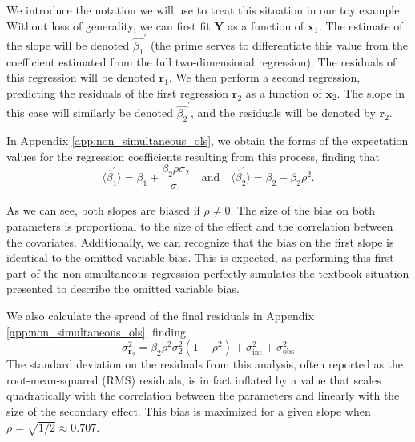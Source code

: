We introduce the notation we will use to treat this situation in our toy example. Without loss of generality, we can first fit $\bm{Y}$ as a function of $\bm{x}_1$. The estimate of the slope will be denoted $\hat{\beta_1}^\prime$ (the prime serves to differentiate this value from the coefficient estimated from the full two-dimensional regression). The residuals of this regression will be denoted $\bm{r}_1$. We then perform a second regression, predicting the residuals of the first regression $\bm{r}_2$ as a function of $\bm{x}_2$. The slope in this case will similarly be denoted $\hat{\beta_2}^\prime$, and the residuals will be denoted by $\bm{r}_2$.

In Appendix \ref{app:non_simultaneous_ols}, we obtain the forms of the expectation values for the regression coefficients resulting from this process, finding that
\begin{equation*}
    \langle\hat{\beta}_1^\prime\rangle = \beta_1 + \frac{\beta_2\rho\sigma_2}{\sigma_1}\quad\text{and}\quad\langle\hat{\beta}_2^\prime\rangle = \beta_2 - \beta_2\rho^2.
\end{equation*}

As we can see, both slopes are biased if $\rho \neq 0$. The size of the bias on both parameters is proportional to the size of the effect and the correlation between the covariates. Additionally, we can recognize that the bias on the first slope is identical to the omitted variable bias. This is expected, as performing this first part of the non-simultaneous regression perfectly simulates the textbook situation presented to describe the omitted variable bias.

We also calculate the spread of the final residuals in Appendix \ref{app:non_simultaneous_ols}, finding
\begin{equation}
    \sigma_{\bm{r}_2}^2 = \beta_2\rho^2\sigma_2^2(1-\rho^2) + \sigma_\text{int}^2 + \sigma_\text{obs}^2
\end{equation}
The standard deviation on the residuals from this analysis, often reported as the root-mean-squared (RMS) residuals, is in fact inflated by a value that scales quadratically with the correlation between the parameters and linearly with the size of the secondary effect. This bias is maximized for a given slope when $\rho = \sqrt{1/2} \approx 0.707$.

